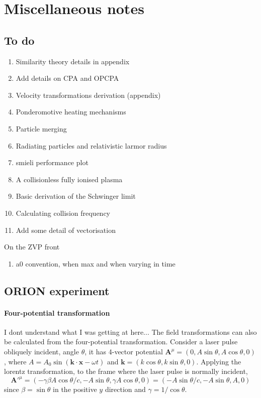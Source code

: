 \chapter{\label{ch:x-misc}Miscellaneous notes}

\minitoc

\section{To do}

\begin{enumerate}
	\item Similarity theory details in appendix
	\item Add details on CPA and OPCPA
	\item Velocity transformations derivation (appendix)
	\item Ponderomotive heating mechanisms
	\item Particle merging
	\item Radiating particles and relativistic larmor radius
	\item smieli performance plot
	\item A collisionless fully ionised plasma
	\item Basic derivation of the Schwinger limit
	\item Calculating collision frequency
	\item Add some detail of vectorisation
\end{enumerate}

On the ZVP front
\begin{enumerate}
	\item a0 convention, when max and when varying in time
\end{enumerate}

\section{ORION experiment} 

\subsubsection{Four-potential transformation}
I dont understand what I was getting at here...
The field transformations can also be calculated from the four-potential transformation. Consider a laser pulse obliquely incident, angle $\theta$, it has 4-vector potential $\mathbf{A}^\mu = (0, A\sin\theta,A\cos\theta,0)$, where $A = A_0\sin(\mathbf{k}\cdot\mathbf{x} - \omega t)$ and $\mathbf{k} = (k\cos\theta,k\sin\theta,0)$. Applying the lorentz transformation, to the frame where the laser pulse is normally incident,
\begin{equation}
	\mathbf{A}'^\mu = (-\gamma\beta A\cos\theta/c,  - A\sin\theta, \gamma A\cos\theta,0) = (-A\sin\theta/c, -A\sin\theta, A,0) 
\end{equation}
since $\beta = \sin\theta$ in the positive $y$ direction and $\gamma = 1/\cos\theta$.

